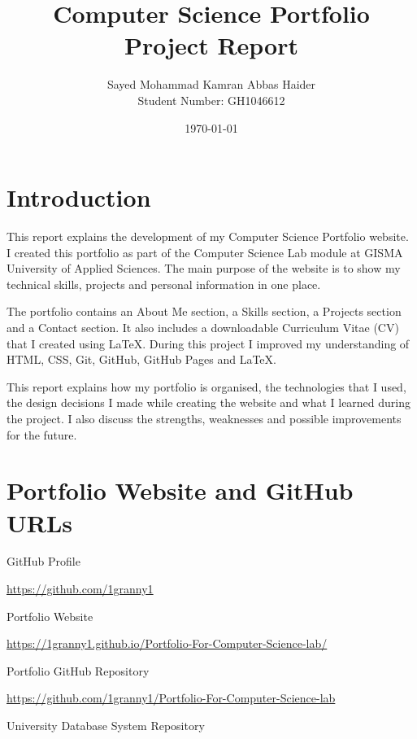 \documentclass[a4paper,12pt]{article}
\title{Computer Science Portfolio Project Report}
\author{
Sayed Mohammad Kamran Abbas Haider\\
Student Number: GH1046612
}
\date{\today}
\begin{document}
\maketitle

\tableofcontents

\newpage

\section{Introduction}

This report explains the development of my Computer Science Portfolio website. I created
this portfolio as part of the Computer Science Lab module at GISMA University of Applied
Sciences. The main purpose of the website is to show my technical skills, projects and
personal information in one place.

The portfolio contains an About Me section, a Skills section, a Projects section and a
Contact section. It also includes a downloadable Curriculum Vitae (CV) that I created
using LaTeX. During this project I improved my understanding of HTML, CSS, Git,
GitHub, GitHub Pages and LaTeX.

This report explains how my portfolio is organised, the technologies that I used,
the design decisions I made while creating the website and what I learned during the
project. I also discuss the strengths, weaknesses and possible improvements for the
future.

\section{Portfolio Website and GitHub URLs}

GitHub Profile

\url{https://github.com/1granny1}

\vspace{0.5cm}

Portfolio Website

\url{https://1granny1.github.io/Portfolio-For-Computer-Science-lab/}

\vspace{0.5cm}

Portfolio GitHub Repository

\url{https://github.com/1granny1/Portfolio-For-Computer-Science-lab}

\vspace{0.5cm}

University Database System Repository
\end{document}
